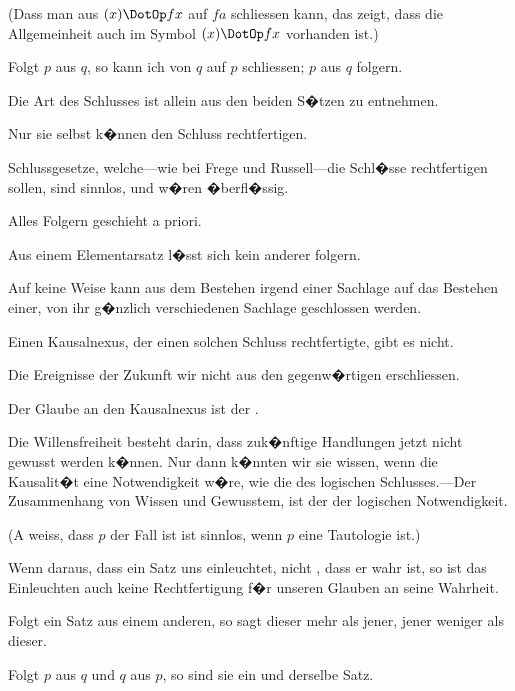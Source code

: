 \begin{propositions}
{(Dass man aus $(x) \DotOp fx$ auf $fa$ schliessen kann,
das zeigt, dass die Allgemeinheit auch im Symbol
\glqq{}$(x) \DotOp fx$\grqq{} vorhanden ist.)}


{Folgt $p$ aus $q$, so kann ich von $q$ auf $p$ schliessen;
$p$ aus $q$ folgern.

Die Art des Schlusses ist allein aus den beiden
S�tzen zu entnehmen.

Nur sie selbst k�nnen den Schluss rechtfertigen.

{\stretchyspace
\glqq{}Schlussgesetze\grqq{}, welche---wie bei Frege und
Russell---die Schl�sse rechtfertigen sollen, sind
sinnlos, und w�ren �berfl�ssig.}}


{Alles Folgern geschieht a priori.}


{Aus einem Elementarsatz l�sst sich kein anderer
folgern.}


{Auf keine Weise kann aus dem Bestehen irgend
einer Sachlage auf das Bestehen einer, von ihr g�nzlich
verschiedenen Sachlage geschlossen werden.}


{Einen Kausalnexus, der einen solchen Schluss
rechtfertigte, gibt es nicht.}


{Die Ereignisse der Zukunft  wir nicht
aus den gegenw�rtigen erschliessen.

Der Glaube an den Kausalnexus ist der .}


{Die Willensfreiheit besteht darin, dass zuk�nftige
Handlungen jetzt nicht gewusst werden k�nnen.
Nur dann k�nnten wir sie wissen, wenn die Kausalit�t
eine  Notwendigkeit w�re, wie die
des logischen Schlusses.---Der Zusammenhang
von Wissen und Gewusstem, ist der der logischen
Notwendigkeit.

(\glqq{}A weiss, dass $p$ der Fall ist\grqq{} ist sinnlos, wenn
$p$ eine Tautologie ist.)}


{Wenn daraus, dass ein Satz uns einleuchtet,
nicht , dass er wahr ist, so ist das Einleuchten
auch keine Rechtfertigung f�r unseren
Glauben an seine Wahrheit.}


{Folgt ein Satz aus einem anderen, so sagt
dieser mehr als jener, jener weniger als dieser.}


{Folgt $p$ aus $q$ und $q$ aus $p$, so sind sie ein und
derselbe Satz.}



\end{propositions}
